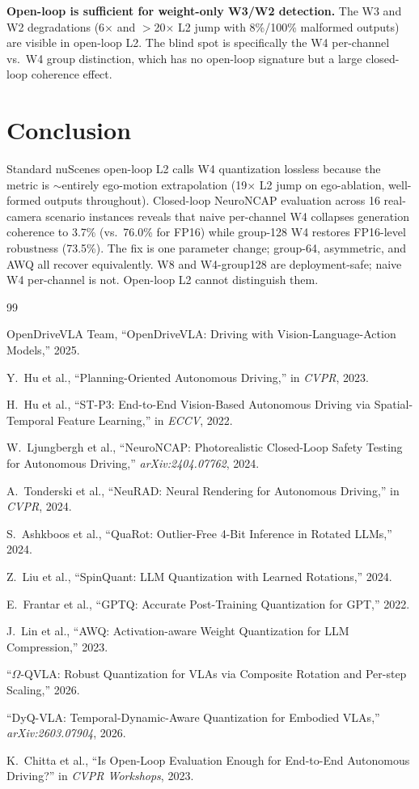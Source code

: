 \documentclass[conference]{IEEEtran}
\begin{document}
\textbf{Open-loop is sufficient for weight-only W3/W2 detection.}
The W3 and W2 degradations (6$\times$ and $>$20$\times$ L2 jump with 8\%/100\% malformed outputs)
are visible in open-loop L2. The blind spot is specifically the W4 per-channel vs.\ W4 group
distinction, which has no open-loop signature but a large closed-loop coherence effect.

\section{Conclusion}
\label{sec:conclusion}

Standard nuScenes open-loop L2 calls W4 quantization lossless because the metric is
$\sim$entirely ego-motion extrapolation (19$\times$ L2 jump on ego-ablation, well-formed outputs
throughout). Closed-loop NeuroNCAP evaluation across 16 real-camera scenario instances reveals
that naive per-channel W4 collapses generation coherence to 3.7\% (vs.\ 76.0\% for FP16) while
group-128 W4 restores FP16-level robustness (73.5\%). The fix is one parameter change;
group-64, asymmetric, and AWQ all recover equivalently. W8 and W4-group128 are deployment-safe;
naive W4 per-channel is not. Open-loop L2 cannot distinguish them.

\begin{thebibliography}{99}

  OpenDriveVLA Team, ``OpenDriveVLA: Driving with Vision-Language-Action Models,'' 2025.

  Y.~Hu et al., ``Planning-Oriented Autonomous Driving,'' in \textit{CVPR}, 2023.

  H.~Hu et al., ``ST-P3: End-to-End Vision-Based Autonomous Driving via Spatial-Temporal
  Feature Learning,'' in \textit{ECCV}, 2022.

  W.~Ljungbergh et al., ``NeuroNCAP: Photorealistic Closed-Loop Safety Testing for Autonomous
  Driving,'' \textit{arXiv:2404.07762}, 2024.

  A.~Tonderski et al., ``NeuRAD: Neural Rendering for Autonomous Driving,''
  in \textit{CVPR}, 2024.

  S.~Ashkboos et al., ``QuaRot: Outlier-Free 4-Bit Inference in Rotated LLMs,'' 2024.

  Z.~Liu et al., ``SpinQuant: LLM Quantization with Learned Rotations,'' 2024.

  E.~Frantar et al., ``GPTQ: Accurate Post-Training Quantization for GPT,'' 2022.

  J.~Lin et al., ``AWQ: Activation-aware Weight Quantization for LLM Compression,'' 2023.

  ``$\Omega$-QVLA: Robust Quantization for VLAs via Composite Rotation and Per-step Scaling,''
  2026.

  ``DyQ-VLA: Temporal-Dynamic-Aware Quantization for Embodied VLAs,''
  \textit{arXiv:2603.07904}, 2026.

  K.~Chitta et al., ``Is Open-Loop Evaluation Enough for End-to-End Autonomous Driving?''
  in \textit{CVPR Workshops}, 2023.

\end{thebibliography}
\end{document}

